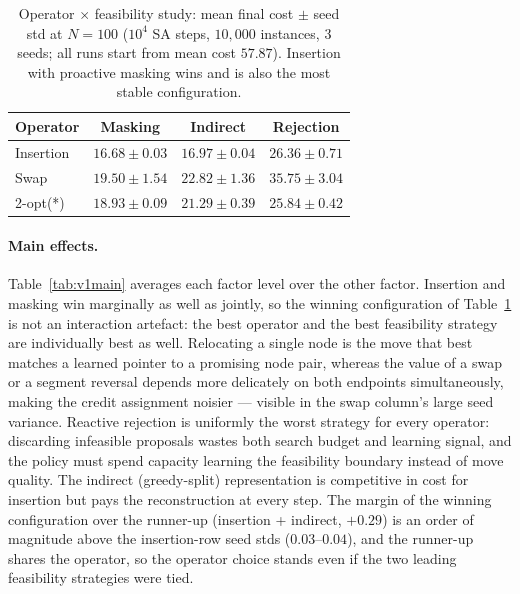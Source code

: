 \documentclass[letterpaper]{article} %
\begin{document}
\begin{table}[t]
\centering
\small
\begin{tabular}{lccc}
\toprule
\textbf{Operator} & \textbf{Masking} & \textbf{Indirect} & \textbf{Rejection} \\
\midrule
Insertion & $\mathbf{16.68 \pm 0.03}$ & $16.97 \pm 0.04$ & $26.36 \pm 0.71$ \\
Swap      & $19.50 \pm 1.54$          & $22.82 \pm 1.36$ & $35.75 \pm 3.04$ \\
2-opt(*)  & $18.93 \pm 0.09$          & $21.29 \pm 0.39$ & $25.84 \pm 0.42$ \\
\bottomrule
\end{tabular}
\caption{Operator $\times$ feasibility study: mean final cost $\pm$ seed std at $N=100$ ($10^4$ SA steps, $10{,}000$ instances, $3$ seeds; all runs start from mean cost $57.87$). Insertion with proactive masking wins and is also the most stable configuration.}
\label{tab:v1grid}
\end{table}

\paragraph{Main effects.}
Table~\ref{tab:v1main} averages each factor level over the other factor. Insertion and masking win marginally as well as jointly, so the winning configuration of Table~\ref{tab:v1grid} is not an interaction artefact: the best operator and the best feasibility strategy are individually best as well. Relocating a single node is the move that best matches a learned pointer to a promising node pair, whereas the value of a swap or a segment reversal depends more delicately on both endpoints simultaneously, making the credit assignment noisier --- visible in the swap column's large seed variance. Reactive rejection is uniformly the worst strategy for every operator: discarding infeasible proposals wastes both search budget and learning signal, and the policy must spend capacity learning the feasibility boundary instead of move quality. The indirect (greedy-split) representation is competitive in cost for insertion but pays the reconstruction at every step. The margin of the winning configuration over the runner-up (insertion + indirect, $+0.29$) is an order of magnitude above the insertion-row seed stds ($0.03$--$0.04$), and the runner-up shares the operator, so the operator choice stands even if the two leading feasibility strategies were tied.
\end{document}
